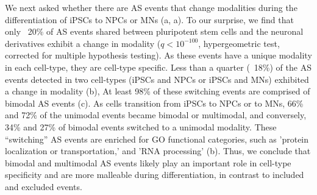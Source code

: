 We next asked whether there are AS events that change modalities during the differentiation of iPSCs to NPCs or MNs (a, a). To our surprise, we find that only ~20\% of AS events shared between pluripotent stem cells and the neuronal derivatives exhibit a change in modality ($q < 10^{-100}$, hypergeometric test, corrected for multiple hypothesis testing). As these events have a unique modality in each cell-type, they are cell-type specific. Less than a quarter (~18\%) of the AS events detected in two cell-types (iPSCs and NPCs or iPSCs and MNs) exhibited a change in modality (b), At least 98\% of these switching events are comprised of bimodal AS events (c). As cells transition from iPSCs to NPCs or to MNs, 66\% and 72\% of the unimodal events became bimodal or multimodal, and conversely, 34\% and 27\% of bimodal events switched to a unimodal modality. These ``switching'' AS events are enriched for GO functional categories, such as 'protein localization or transportation,' and 'RNA processing' (b). Thus, we conclude that bimodal and multimodal AS events likely play an important role in cell-type specificity and are more malleable during differentiation, in contrast to included and excluded events.

